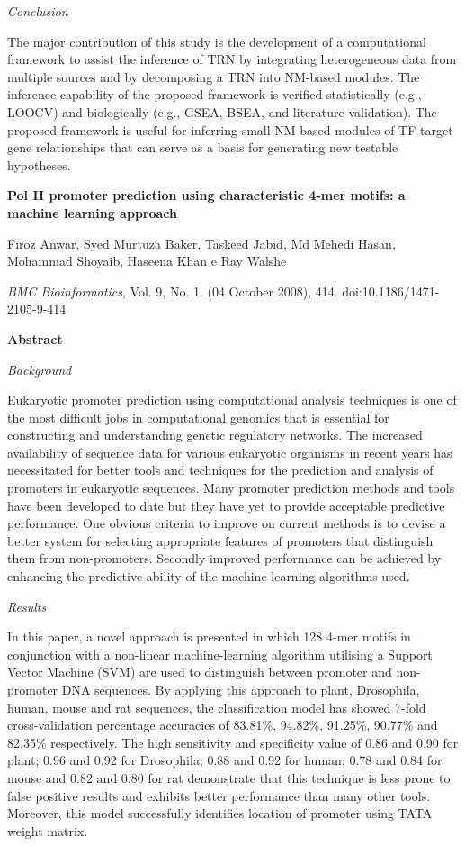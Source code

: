 {\it Conclusion}

The major contribution of this study is the development of a computational framework to assist the inference of TRN by integrating heterogeneous data from multiple sources and by decomposing a TRN into NM-based modules. The inference capability of the proposed framework is verified statistically (e.g., LOOCV) and biologically (e.g., GSEA, BSEA, and literature validation). The proposed framework is useful for inferring small NM-based modules of TF-target gene relationships that can serve as a basis for generating new testable hypotheses.



{\Large \bf Pol II promoter prediction using characteristic 4-mer motifs: a machine learning approach}

Firoz Anwar, Syed Murtuza Baker, Taskeed Jabid, Md Mehedi Hasan, Mohammad Shoyaib, Haseena Khan e Ray Walshe

{\it BMC Bioinformatics}, Vol. 9, No. 1. (04 October 2008), 414. doi:10.1186/1471-2105-9-414

{\large \bf Abstract}

{\it Background}

Eukaryotic promoter prediction using computational analysis techniques is one of the most difficult jobs in computational genomics that is essential for constructing and understanding genetic regulatory networks. The increased availability of sequence data for various eukaryotic organisms in recent years has necessitated for better tools and techniques for the prediction and analysis of promoters in eukaryotic sequences. Many promoter prediction methods and tools have been developed to date but they have yet to provide acceptable predictive performance. One obvious criteria to improve on current methods is to devise a better system for selecting appropriate features of promoters that distinguish them from non-promoters. Secondly improved performance can be achieved by enhancing the predictive ability of the machine learning algorithms used.

{\it Results}

In this paper, a novel approach is presented in which 128 4-mer motifs in conjunction with a non-linear machine-learning algorithm utilising a Support Vector Machine (SVM) are used to distinguish between promoter and non-promoter DNA sequences. By applying this approach to plant, Drosophila, human, mouse and rat sequences, the classification model has showed 7-fold cross-validation percentage accuracies of 83.81\%, 94.82\%, 91.25\%, 90.77\% and 82.35\% respectively. The high sensitivity and specificity value of 0.86 and 0.90 for plant; 0.96 and 0.92 for Drosophila; 0.88 and 0.92 for human; 0.78 and 0.84 for mouse and 0.82 and 0.80 for rat demonstrate that this technique is less prone to false positive results and exhibits better performance than many other tools. Moreover, this model successfully identifies location of promoter using TATA weight matrix.

